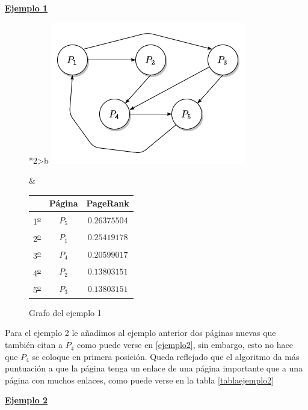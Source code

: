 \documentclass[size=a4, parskip=half, titlepage=false, toc=flat, toc=bib, 12pt, twoside]{scrartcl}
\theoremstyle{theorem-style}
\theoremstyle{definition-style}
\theoremstyle{remark-style}
\theoremstyle{example-style}
\theoremstyle{definition-style}
\theoremstyle{remark-style}
\begin{document}
\underline{\textbf{Ejemplo 1}}
\begin{figure}[!ht]
  \begin{tabular}{*{2}{>{\centering\arraybackslash}b{}}}
  \centering
    \includegraphics[scale=0.5]{./img/grafoej1}
    \caption{Grafo del ejemplo 1}
    \label{ejemplo1}

    &
      \renewcommand{\arraystretch}{1.3}
      \begin{tabular}{ccc}
         & Página & PageRank     \\ \hline
      1\textsuperscript{\underline{o}}} & $P_5$  & $0.26375504$ \\ \hline
      2\textsuperscript{\underline{o}}} & $P_1$  & $0.25419178$ \\ \hline
      3\textsuperscript{\underline{o}}} & $P_4$  & $0.20599017$ \\ \hline
      4\textsuperscript{\underline{o}}} & $P_2$  & $0.13803151$ \\ \hline
      5\textsuperscript{\underline{o}}} & $P_3$  & $0.13803151$ \\ \hline
      \end{tabular}
  \end{tabular}
\end{figure}

Para el ejemplo 2 le añadimos al ejemplo anterior dos páginas nuevas que también citan a $P_4$ como puede verse en \ref{ejemplo2}, sin embargo, esto no hace que $P_4$ se coloque en primera posición. Queda reflejado que el algoritmo da más puntuación a que la página tenga un enlace de una página importante que a una página con muchos enlaces, como puede verse en la tabla \ref{tablaejemplo2}

\underline{\textbf{Ejemplo 2}}
\end{document}

